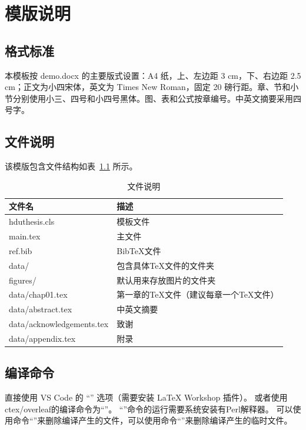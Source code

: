 
\chapter{模版说明}

\section{格式标准}

本模板按 demo.docx 的主要版式设置：A4 纸，上、左边距 3 cm，下、右边距 2.5 cm；正文为小四宋体，英文为 Times New Roman，固定 20 磅行距。章、节和小节分别使用小三、四号和小四号黑体。图、表和公式按章编号。中英文摘要采用四号字。

\section{文件说明}

该模版包含文件结构如表~\ref{tab:file} 所示。

\begin{table}[htp]
    \centering
    \caption{文件说明}
    \begin{tabularx}{\linewidth}{Xl}
      \toprule
      文件名          & 描述                         \\
      \midrule
      hduthesis.cls   & 模板文件                     \\
      main.tex & 主文件 \\
      ref.bib & BibTeX文件    \\
      data/ & 包含具体TeX文件的文件夹 \\
      figures/ & 默认用来存放图片的文件夹 \\
      data/chap01.tex & 第一章的TeX文件（建议每章一个TeX文件）\\
      data/abstract.tex & 中英文摘要 \\
      data/acknowledgements.tex & 致谢 \\
      data/appendix.tex & 附录 \\
      \bottomrule
    \end{tabularx}
    \label{tab:file}
  \end{table}


\section{编译命令}

直接使用 VS Code 的 ``'' 选项（需要安装 LaTeX Workshop 插件）。
或者使用ctex/overleaf的编译命令为``''。
``''命令的运行需要系统安装有Perl解释器。
可以使用命令``''来删除编译产生的文件，可以使用命令``''来删除编译产生的临时文件。

